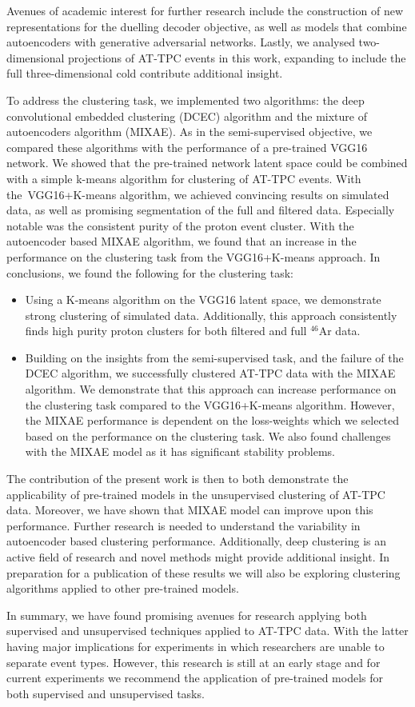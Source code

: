 Avenues of academic interest for further research include the construction of new representations for the duelling decoder objective, as well as models that combine autoencoders with generative adversarial networks.  Lastly, we analysed two-dimensional projections of AT-TPC events in this work, expanding to include the full three-dimensional cold contribute additional insight.

To address the clustering task, we implemented two algorithms: the deep convolutional embedded clustering (DCEC) algorithm and the mixture of autoencoders algorithm (MIXAE). As in the semi-supervised objective, we compared these algorithms with the performance of a pre-trained VGG16 network. We showed that the pre-trained network latent space could be combined with a simple k-means algorithm for clustering of AT-TPC events. With the VGG16+K-means algorithm, we achieved convincing results on simulated data, as well as promising segmentation of the full and filtered data. Especially notable was the consistent purity of the proton event cluster. With the autoencoder based MIXAE  algorithm, we found that an increase in the performance on the clustering task from the VGG16+K-means approach.  In conclusions, we found the following for the clustering task:

\begin{itemize}
\item Using a K-means algorithm on the VGG16 latent space, we demonstrate strong clustering of simulated data. Additionally, this approach consistently finds high purity proton clusters for both filtered and full ${}^{46}$Ar data.
\item Building on the insights from the semi-supervised task, and the failure of the DCEC algorithm,  we successfully clustered AT-TPC data with the MIXAE algorithm. We demonstrate that this approach can increase performance on the clustering task compared to the VGG16+K-means algorithm.  However, the MIXAE performance is dependent on the loss-weights which we selected based on the performance on the clustering task. We also found challenges with the MIXAE model as it has significant stability problems. 
\end{itemize}

The contribution of the present work is then to both demonstrate the applicability of pre-trained models in the unsupervised clustering of AT-TPC data. Moreover, we have shown that MIXAE model can improve upon this performance. Further research is needed to understand the variability in autoencoder based clustering performance. Additionally, deep clustering is an active field of research and novel methods might provide additional insight. In preparation for a publication of these results we will also be exploring clustering algorithms applied to other pre-trained models.

In summary, we have found promising avenues for research applying both supervised and unsupervised techniques applied to AT-TPC data. With the latter having major implications for experiments in which researchers are unable to separate event types. However, this research is still at an early stage and for current experiments we recommend the application of pre-trained models for both supervised and unsupervised tasks.